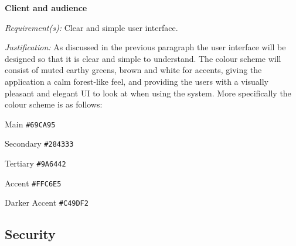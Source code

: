 \textsf{\bfseries Client and audience} \\ \vspace{0.1cm}

\textit{Requirement(s):} Clear and simple user interface.\\ \vspace{0.1cm}

\textit{Justification:}
As discussed in the previous paragraph the user interface will
be designed so that it is clear and simple to understand. The 
colour scheme will consist of muted earthy greens, brown and
white for accents, giving the application a calm forest-like 
feel, and providing the users with a visually pleasant and 
elegant UI to look at when using the system. More specifically 
the colour scheme is as follows:\\ \vspace{0.2cm}

\hspace{\parindent} \quad Main \texttt{\#69CA95}\\ 
\vspace{0.2cm}

\hspace{\parindent} \quad Secondary \texttt{\#284333}\\ 
\vspace{0.2cm}

\hspace{\parindent} \quad Tertiary \texttt{\#9A6442}\\ 
\vspace{0.2cm}

\hspace{\parindent} \quad Accent \texttt{\#FFC6E5}\\ 
\vspace{0.2cm}

\hspace{\parindent} \quad Darker Accent \texttt{\#C49DF2}\\ 
\vspace{0.2cm}

\subsection{Security}

